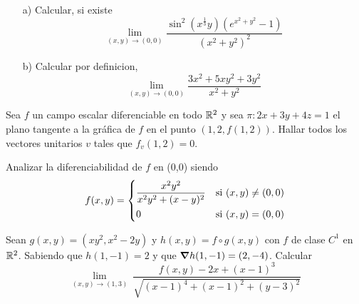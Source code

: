 
\begin{question}

\vspace{1em} %

\begin{itemize}
    \item[a)] Calcular, si existe
    \[
        \lim_{(x,y)\to(0,0)} \frac{\sin^2{(x^{\frac{1}{3}}y)}(e^{x^2+y^2}-1)}{(x^2+y^2)^2}
    \]
     \item[b)] Calcular por definicion,
     \[
        \lim_{(x,y)\to(0,0)} \frac{3x^2+5xy^2+3y^2}{x^2+y^2}
    \]
\end{itemize}



\end{question}

\begin{question}
    Sea $f$ un campo escalar diferenciable en todo $\mathbb{R}^2$ y sea $\pi:2x+3y+4z=1$ el plano tangente a la gráfica de $f$ en el punto $(1,2,f(1,2))$. Hallar todos los vectores unitarios $v$ tales que $f_v(1,2)=0.$
\end{question}
\begin{question}
    Analizar la diferenciabilidad de $f$ en (0,0) siendo
      \[
        f(x,y) =
        \begin{dcases}
            \frac{x^2y^2}{x^2y^2+(x-y)^2} & \textnormal{si}\ (x,y) \neq (0,0) \\
            0                         & \textnormal{si}\ (x,y) = (0,0)
        \end{dcases}
    \]
\end{question}
\begin{question}
    Sean $g(x,y)=(xy^2,x^2-2y)$ y $h(x,y)=f \circ g(x,y)$ con $f$ de clase $C^1$ en $\mathbb{R}^2$. Sabiendo que $h(1,-1)=2$ y que $\grad h(1,-1)=(2,-4)$. Calcular
    \[
        \lim_{(x,y)\to (1,3)} \ 
        \frac{f(x,y)-2x+(x-1)^3}{\sqrt{(x-1)^4+(x-1)^2+(y-3)^2}}       
    \]
\end{question}
\newpage

